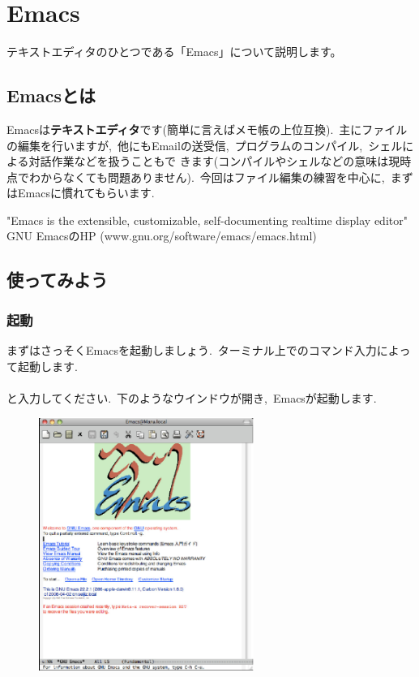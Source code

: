 \documentclass{jarticle}
\begin{document}
\newpage
\section{Emacs}
テキストエディタのひとつである「Emacs」について説明します。
\subsection{Emacsとは}

Emacsは{\bf テキストエディタ}です(簡単に言えばメモ帳の上位互換).\ 主にファイルの編集を行いますが,\ 他にもEmailの送受信,\ プログラムのコンパイル,\ シェルによる対話作業などを扱うこともで
きます(コンパイルやシェルなどの意味は現時点でわからなくても問題ありません).\ 
今回はファイル編集の練習を中心に,\ まずはEmacsに慣れてもらいます.\ 

\begin{flushright}
"Emacs is the extensible, customizable, self-documenting realtime display editor"\\
GNU EmacsのHP (www.gnu.org/software/emacs/emacs.html)
\end{flushright}

\subsection{使ってみよう}
\subsubsection{起動}
まずはさっそくEmacsを起動しましょう.\ ターミナル上でのコマンド入力によっ
て起動します.\ \\
\quad \quad {}\\
と入力してください.\ 下のようなウインドウが開き,\ Emacsが起動します.\ 

\begin{figure}[ht]
  \begin{center}
    \includegraphics[width=70mm,pagebox=cropbox,clip]{fig/emacs001.pdf}
  \end{center}
\end{figure} 
\end{document}
